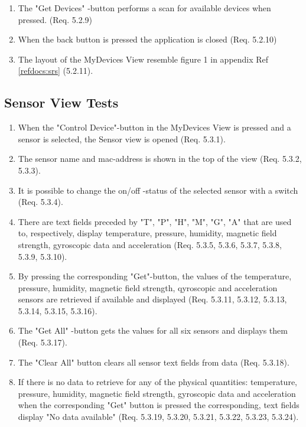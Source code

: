 \documentclass[a4paper]{article}
\newlength{\testlabellength}
\newenvironment{testlist}{\begin{enumerate}[label=\bfseries Test \thesubsection.\arabic* , labelindent=0pt, labelwidth=\testlabellength , leftmargin=2cm]}{\end{enumerate}}
\begin{document}
\begin{appendices}
\begin{testlist}
    \item The "Get Devices" -button performs a scan for available devices when pressed. (Req. 5.2.9)
   
    \item When the back button is pressed the application is closed (Req. 5.2.10)
    
    \item The layout of the MyDevices View resemble figure 1 in appendix  Ref \ref{refdocs:srs} (5.2.11).
\end{testlist}

\subsection{Sensor View Tests}
\begin{testlist}
\item When the "Control Device"-button in the MyDevices View is pressed and a sensor is selected, the Sensor view is opened (Req. 5.3.1).

\item The sensor name and mac-address is shown in the top of the view (Req. 5.3.2, 5.3.3).
 
\item It is possible to change the on/off -status of the selected sensor with a switch (Req. 5.3.4).

\item There are text fields preceded by "T", "P", "H", "M", "G", "A" that are used to, respectively, display temperature, pressure, humidity, magnetic field strength, gyroscopic data and acceleration (Req. 5.3.5, 5.3.6, 5.3.7, 5.3.8, 5.3.9, 5.3.10).

\item By pressing the corresponding "Get"-button, the values of the temperature, pressure, humidity, magnetic field strength, qyroscopic and acceleration sensors are retrieved if available and displayed (Req. 5.3.11, 5.3.12, 5.3.13, 5.3.14, 5.3.15, 5.3.16).

\item The "Get All" -button gets the values for all six sensors and displays them (Req. 5.3.17).

\item The "Clear All" button clears all sensor text fields from data (Req. 5.3.18).

\item If there is no data to retrieve for any of the physical quantities: temperature, pressure, humidity, magnetic field strength, gyroscopic data and acceleration when the corresponding "Get" button is pressed the corresponding, text fields display "No data available" (Req. 5.3.19, 5.3.20, 5.3.21, 5.3.22, 5.3.23, 5.3.24).


\end{testlist}
\end{appendices}
\end{document}
